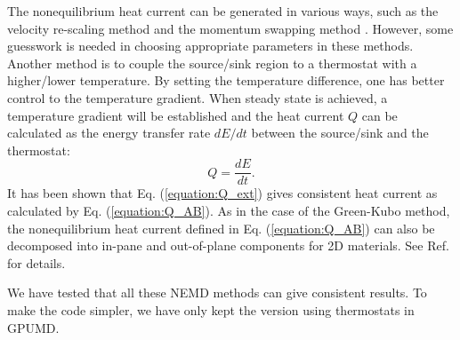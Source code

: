 \documentclass[12pt,a4paper]{report}
\begin{document}
The nonequilibrium heat current can be generated in various ways, such as the velocity re-scaling method \cite{ikeshoji1994mp,jund1999prb} and the momentum swapping method  \cite{plathe1997jcp}. However, some guesswork is needed in choosing appropriate parameters in these methods. Another method is to couple the source/sink region to a thermostat with a higher/lower temperature. By setting the temperature difference, one has better control to the temperature gradient. When steady state is achieved, a temperature gradient will be established and the heat current $Q$ can be calculated as the energy transfer rate $d E/d t$ between the source/sink and the thermostat:
\begin{equation}
\boxed{
Q=\frac{dE}{dt}
}.
\label{equation:Q_ext}
\end{equation}
It has been shown \cite{fan2017prb} that Eq. (\ref{equation:Q_ext}) gives consistent heat current as calculated by Eq. (\ref{equation:Q_AB}). As in the case of the Green-Kubo method, the nonequilibrium heat current defined in Eq. (\ref{equation:Q_AB}) can also be decomposed into in-pane and out-of-plane components for 2D materials. See Ref. \cite{fan2017prb} for details.

We have tested that all these NEMD methods can give consistent results. To make the code simpler, we have only kept the version using thermostats in GPUMD.
\end{document}
